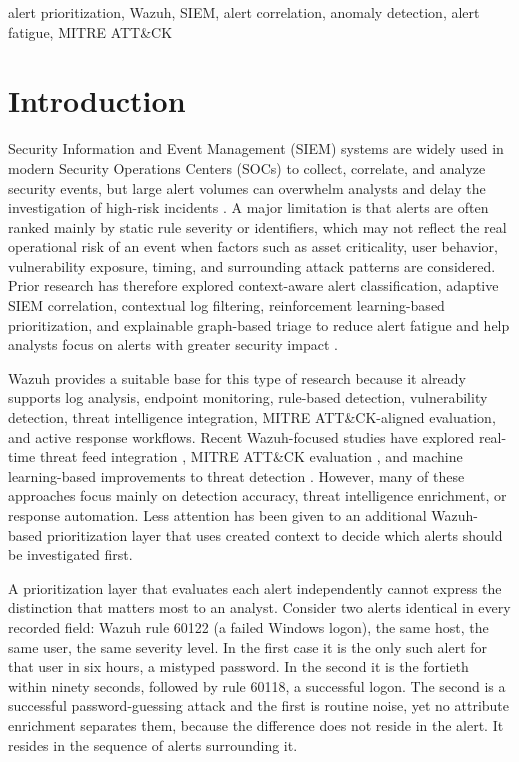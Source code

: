 \documentclass[conference]{IEEEtran}
\begin{document}
\begin{IEEEkeywords}
alert prioritization, Wazuh, SIEM, alert correlation, anomaly detection, alert fatigue, MITRE ATT\&CK
\end{IEEEkeywords}

\section{Introduction}

Security Information and Event Management (SIEM) systems are widely used in modern Security Operations Centers (SOCs) to collect, correlate, and analyze security events, but large alert volumes can overwhelm analysts and delay the investigation of high-risk incidents \cite{ref14}. A major limitation is that alerts are often ranked mainly by static rule severity or identifiers, which may not reflect the real operational risk of an event when factors such as asset criticality, user behavior, vulnerability exposure, timing, and surrounding attack patterns are considered. Prior research has therefore explored context-aware alert classification, adaptive SIEM correlation, contextual log filtering, reinforcement learning-based prioritization, and explainable graph-based triage to reduce alert fatigue and help analysts focus on alerts with greater security impact \cite{ref1,ref5,ref6,ref7,ref8}.

Wazuh provides a suitable base for this type of research because it already supports log analysis, endpoint monitoring, rule-based detection, vulnerability detection, threat intelligence integration, MITRE ATT\&CK-aligned evaluation, and active response workflows. Recent Wazuh-focused studies have explored real-time threat feed integration \cite{ref3}, MITRE ATT\&CK evaluation \cite{ref12}, and machine learning-based improvements to threat detection \cite{ref13}. However, many of these approaches focus mainly on detection accuracy, threat intelligence enrichment, or response automation. Less attention has been given to an additional Wazuh-based prioritization layer that uses created context to decide which alerts should be investigated first.

A prioritization layer that evaluates each alert independently cannot express the distinction that matters most to an analyst. Consider two alerts identical in every recorded field: Wazuh rule 60122 (a failed Windows logon), the same host, the same user, the same severity level. In the first case it is the only such alert for that user in six hours, a mistyped password. In the second it is the fortieth within ninety seconds, followed by rule 60118, a successful logon. The second is a successful password-guessing attack and the first is routine noise, yet no attribute enrichment separates them, because the difference does not reside in the alert. It resides in the sequence of alerts surrounding it.
\end{document}
